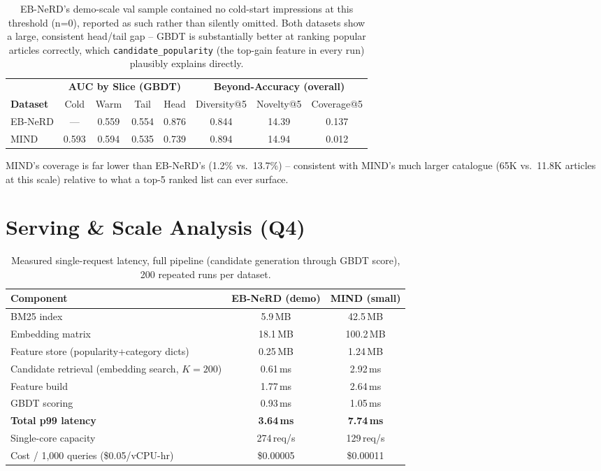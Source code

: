\documentclass[11pt,a4paper]{article}
\begin{document}
\begin{table}[h]
\centering\small
\begin{tabular}{l cccc ccc}
\toprule
& \multicolumn{4}{c}{\textbf{AUC by Slice (GBDT)}} & \multicolumn{3}{c}{\textbf{Beyond-Accuracy (overall)}} \\
\cmidrule(lr){2-5}\cmidrule(lr){6-8}
\textbf{Dataset} & Cold & Warm & Tail & Head & Diversity@5 & Novelty@5 & Coverage@5 \\
\midrule
EB-NeRD & --- & 0.559 & 0.554 & 0.876 & 0.844 & 14.39 & 0.137 \\
MIND    & 0.593 & 0.594 & 0.535 & 0.739 & 0.894 & 14.94 & 0.012 \\
\bottomrule
\end{tabular}
\caption{EB-NeRD's demo-scale val sample contained no cold-start impressions at this
threshold (n=0), reported as such rather than silently omitted. Both datasets show a
large, consistent head/tail gap -- GBDT is substantially better at ranking popular
articles correctly, which \texttt{candidate\_popularity} (the top-gain feature in every
run) plausibly explains directly.}
\label{tab:slicing}
\end{table}

MIND's coverage is far lower than EB-NeRD's (1.2\% vs.\ 13.7\%) -- consistent with
MIND's much larger catalogue (65K vs.\ 11.8K articles at this scale) relative to what a
top-5 ranked list can ever surface.

\section{Serving \& Scale Analysis (Q4)}

\begin{table}[h]
\centering\small
\begin{tabular}{lcc}
\toprule
\textbf{Component} & \textbf{EB-NeRD (demo)} & \textbf{MIND (small)} \\
\midrule
BM25 index & 5.9\,MB & 42.5\,MB \\
Embedding matrix & 18.1\,MB & 100.2\,MB \\
Feature store (popularity+category dicts) & 0.25\,MB & 1.24\,MB \\
\midrule
Candidate retrieval (embedding search, $K{=}200$) & 0.61\,ms & 2.92\,ms \\
Feature build & 1.77\,ms & 2.64\,ms \\
GBDT scoring & 0.93\,ms & 1.05\,ms \\
\textbf{Total p99 latency} & \textbf{3.64\,ms} & \textbf{7.74\,ms} \\
Single-core capacity & 274\,req/s & 129\,req/s \\
Cost / 1{,}000 queries (\$0.05/vCPU-hr) & \$0.00005 & \$0.00011 \\
\bottomrule
\end{tabular}
\caption{Measured single-request latency, full pipeline (candidate generation through
GBDT score), 200 repeated runs per dataset.}
\label{tab:serving}
\end{table}
\end{document}
